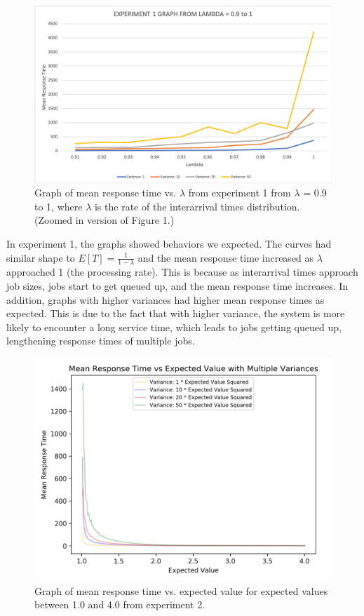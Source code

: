 \documentclass[12pt]{article}
\begin{document}
\begin{figure}[H]
\includegraphics[scale = 0.6]{Graph1ZoomedIn.png}
\caption{Graph of mean response time vs. $\lambda$ from experiment 1 from $\lambda$ = 0.9 to 1, where $\lambda$ is the rate of the interarrival times distribution. (Zoomed in version of Figure 1.)}
\end{figure}
\pagebreak
In experiment 1, the graphs showed behaviors we expected. The curves had similar shape to $E[T] = \frac{1}{1-\lambda}$ and the mean response time increased as $\lambda$ approached 1 (the processing rate). This is because as interarrival times approach job sizes, jobs start to get queued up, and the mean response time increases. In addition, graphs with higher variances had higher mean response times as expected. This is due to the fact that with higher variance, the system is more likely to encounter a long service time, which leads to jobs getting queued up, lengthening response times of multiple jobs. \\

\begin{figure}[H]
\includegraphics[width=\linewidth]{Analysis2_1.png}
\caption{Graph of mean response time vs. expected value for expected values between 1.0 and 4.0 from experiment 2.}
\end{figure}
\end{document}
